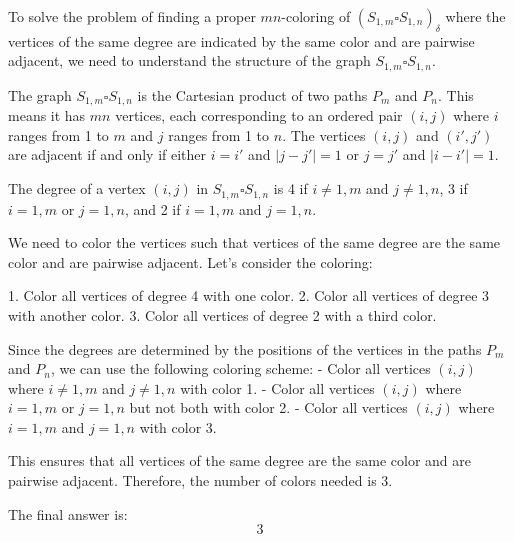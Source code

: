 To solve the problem of finding a proper \(mn\)-coloring of \((S_{1,m} \square S_{1,n})_\delta\) where the vertices of the same degree are indicated by the same color and are pairwise adjacent, we need to understand the structure of the graph \(S_{1,m} \square S_{1,n}\).

The graph \(S_{1,m} \square S_{1,n}\) is the Cartesian product of two paths \(P_m\) and \(P_n\). This means it has \(mn\) vertices, each corresponding to an ordered pair \((i,j)\) where \(i\) ranges from 1 to \(m\) and \(j\) ranges from 1 to \(n\). The vertices \((i,j)\) and \((i',j')\) are adjacent if and only if either \(i = i'\) and \(|j - j'| = 1\) or \(j = j'\) and \(|i - i'| = 1\).

The degree of a vertex \((i,j)\) in \(S_{1,m} \square S_{1,n}\) is 4 if \(i \neq 1, m\) and \(j \neq 1, n\), 3 if \(i = 1, m\) or \(j = 1, n\), and 2 if \(i = 1, m\) and \(j = 1, n\).

We need to color the vertices such that vertices of the same degree are the same color and are pairwise adjacent. Let's consider the coloring:

1. Color all vertices of degree 4 with one color.
2. Color all vertices of degree 3 with another color.
3. Color all vertices of degree 2 with a third color.

Since the degrees are determined by the positions of the vertices in the paths \(P_m\) and \(P_n\), we can use the following coloring scheme:
- Color all vertices \((i,j)\) where \(i \neq 1, m\) and \(j \neq 1, n\) with color 1.
- Color all vertices \((i,j)\) where \(i = 1, m\) or \(j = 1, n\) but not both with color 2.
- Color all vertices \((i,j)\) where \(i = 1, m\) and \(j = 1, n\) with color 3.

This ensures that all vertices of the same degree are the same color and are pairwise adjacent. Therefore, the number of colors needed is 3.

The final answer is:
\[
\boxed{3}
\]